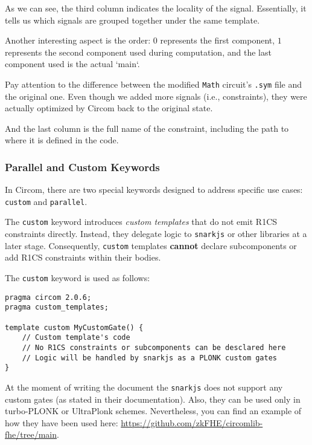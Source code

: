 \documentclass[../lecture-notes.tex]{subfiles}
\begin{document}
    As we can see, the third column indicates the locality of the signal.
    Essentially, it tells us which signals are grouped together under the same template.

    Another interesting aspect is the order: $0$ represents the first component, $1$ represents the second component used during computation, and the last component used is the actual `main`.

    \begin{remark}
        Pay attention to the difference between the modified \texttt{Math} circuit's \texttt{.sym} file and the original one.
        Even though we added more signals (i.e., constraints), they were actually optimized by Circom back to the original state.
    \end{remark}

    And the last column is the full name of the constraint, including the path to where it is defined in the code.

    \subsubsection{Parallel and Custom Keywords}

    In Circom, there are two special keywords designed to address specific use cases: \texttt{custom} and \texttt{parallel}.

    The \texttt{custom} keyword introduces \emph{custom templates} that do not emit R1CS constraints directly.
    Instead, they delegate logic to \texttt{snarkjs} or other libraries at a later stage.
    Consequently, \texttt{custom} templates \textbf{cannot} declare subcomponents or add R1CS constraints within their bodies.

    The \texttt{custom} keyword is used as follows:

    \begin{lstlisting}[language=Circom,basicstyle=\ttfamily\footnotesize]
pragma circom 2.0.6;
pragma custom_templates;

template custom MyCustomGate() {
    // Custom template's code
    // No R1CS constraints or subcomponents can be desclared here
    // Logic will be handled by snarkjs as a PLONK custom gates
}
    \end{lstlisting}

    \begin{remark}
        At the moment of writing the document the \texttt{snarkjs} does not support any custom gates (as stated in their documentation).
        Also, they can be used only in turbo-PLONK or UltraPlonk schemes.
        Nevertheless, you can find an example of how they have been used here: \url{https://github.com/zkFHE/circomlib-fhe/tree/main}.
    \end{remark}
\end{document}
